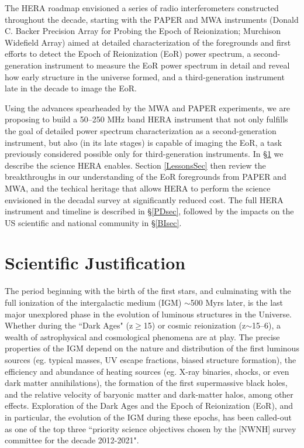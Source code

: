 \documentclass[preprint]{aastex}
\begin{document}
The HERA roadmap envisioned a series of radio interferometers constructed throughout the decade, starting with the PAPER and MWA instruments (Donald C. Backer Precision Array for Probing the Epoch of Reionization; Murchison Widefield Array) aimed at detailed characterization of the foregrounds and first efforts to detect the Epoch of Reionization (EoR) power spectrum, a second-generation instrument to measure the EoR power spectrum in detail and reveal how early structure in the universe formed, and a third-generation instrument late in the decade to image the EoR. 

Using the advances spearheaded by the MWA and PAPER experiments, we are proposing to build a 50--250 MHz band HERA instrument that not only fulfills the goal of detailed power spectrum characterization as a second-generation instrument, but also (in its late stages) is capable of imaging the EoR, a task previously considered possible only for third-generation instruments.
In \S \ref{SJsec} we describe the science HERA enables. Section \ref{LessonsSec} then review the breakthroughs in our understanding of the EoR foregrounds from PAPER and MWA, and the techical heritage that allows HERA to perform the science envisioned in the decadal survey at significantly reduced cost. The full HERA instrument and timeline is described in \S \ref{PDsec}, followed by the impacts on the US scientific and national community in \S \ref{BIsec}.

\vspace{-0.25in}
\section{Scientific Justification}
\label{SJsec}

The period beginning with the birth of the first stars, and culminating with the full ionization of the intergalactic medium (IGM) $\sim$500 Myrs later, is the last major unexplored phase in the evolution of luminous structures in the Universe.  Whether during the ``Dark Ages" (z$\ge$15) or cosmic reionization (z$\sim$15--6), a wealth of astrophysical and cosmological phenomena are at play.  The precise properties of the IGM depend on the nature and distribution of the first luminous sources (eg. typical masses, UV escape fractions, biased structure formation), the efficiency and abundance of heating sources (eg. X-ray binaries, shocks, or even dark matter annihilations), the formation of the first supermassive black holes, and the relative velocity of baryonic matter and dark-matter halos, among other effects.  Exploration of the Dark Ages and the Epoch of Reionization (EoR), and in particular, the evolution of the IGM during these epochs, has been called-out as one of the top three ``priority science objectives chosen by the [NWNH] survey committee for the decade 2012-2021".
\end{document}
